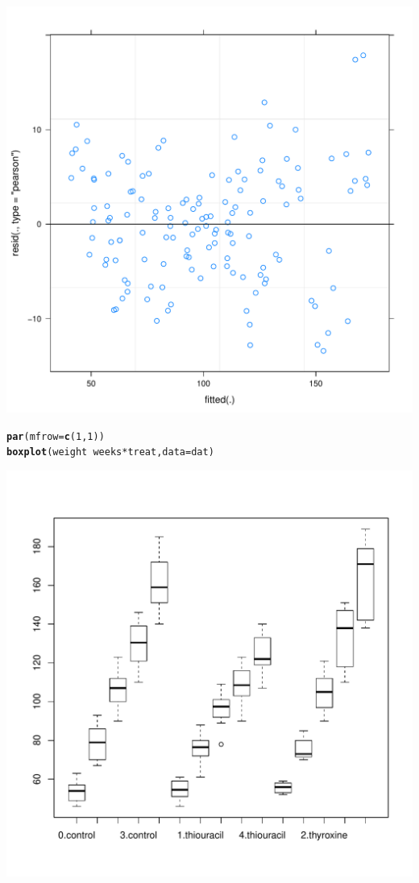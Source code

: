 \documentclass{article}\usepackage[]{graphicx}\usepackage[]{color}
\makeatletter
\def\maxwidth{ %
  \ifdim\Gin@nat@width>\linewidth
    \linewidth
  \else
    \Gin@nat@width
  \fi
}
\newcommand{\hlnum}[1]{\textcolor[rgb]{0.686,0.059,0.569}{#1}}%
\newcommand{\hlopt}[1]{\textcolor[rgb]{0,0,0}{#1}}%
\newcommand{\hlstd}[1]{\textcolor[rgb]{0.345,0.345,0.345}{#1}}%
\newcommand{\hlkwc}[1]{\textcolor[rgb]{0.333,0.667,0.333}{#1}}%
\newcommand{\hlkwd}[1]{\textcolor[rgb]{0.737,0.353,0.396}{\textbf{#1}}}%
\newenvironment{kframe}{%
 \def\at@end@of@kframe{}%
 \ifinner\ifhmode%
  \def\at@end@of@kframe{\end{minipage}}%
  \begin{minipage}{\columnwidth}%
 \fi\fi%
 \def\FrameCommand##1{\hskip\@totalleftmargin \hskip-\fboxsep
 \colorbox{shadecolor}{##1}\hskip-\fboxsep
     \hskip-\linewidth \hskip-\@totalleftmargin \hskip\columnwidth}%
 \MakeFramed {\advance\hsize-\width
   \@totalleftmargin\z@ \linewidth\hsize
   \@setminipage}}%
 {\par\unskip\endMakeFramed%
 \at@end@of@kframe}
\newenvironment{knitrout}{}{} %
\makeatother
\begin{document}
\begin{enumerate}[(a)]
\begin{knitrout}
\begin{kframe}
\end{kframe}
\includegraphics[width=\maxwidth]{figure/unnamed-chunk-10-2} 
\begin{kframe}\begin{alltt}
  \hlkwd{par}\hlstd{(}\hlkwc{mfrow} \hlstd{=} \hlkwd{c}\hlstd{(}\hlnum{1}\hlstd{,} \hlnum{1}\hlstd{))}
  \hlkwd{boxplot}\hlstd{(weight} \hlopt{~} \hlstd{weeks}\hlopt{*}\hlstd{treat,} \hlkwc{data} \hlstd{= dat)}
\end{alltt}
\end{kframe}
\includegraphics[width=\maxwidth]{figure/unnamed-chunk-10-3} 


\end{knitrout}
\end{enumerate}
\end{document}

